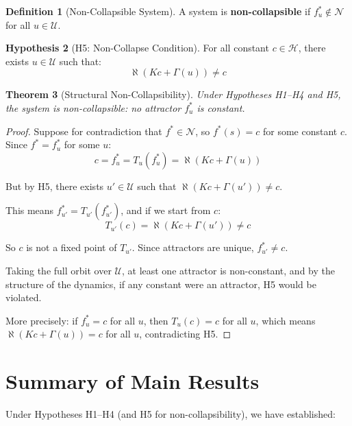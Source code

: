 \documentclass[11pt,a4paper]{article}
\theoremstyle{plain}
\newtheorem{theorem}{Theorem}[section]
\theoremstyle{definition}
\newtheorem{definition}[theorem]{Definition}
\newtheorem{hypothesis}[theorem]{Hypothesis}
\newcommand{\Hilb}{\mathcal{H}}
\newcommand{\U}{\mathcal{U}}
\begin{document}
\begin{definition}[Non-Collapsible System]
A system is \textbf{non-collapsible} if $f^*_u \notin \mathcal{N}$ for all $u \in \U$.
\end{definition}

\begin{hypothesis}[H5: Non-Collapse Condition]\label{hyp:H5}
For all constant $c \in \Hilb$, there exists $u \in \U$ such that:
\[
\aleph(Kc + \Gamma(u)) \neq c
\]
\end{hypothesis}

\begin{theorem}[Structural Non-Collapsibility]\label{thm:noncollapse}
Under Hypotheses H1--H4 and H5, the system is non-collapsible: no attractor $f^*_u$ is constant.
\end{theorem}

\begin{proof}
Suppose for contradiction that $f^* \in \mathcal{N}$, so $f^*(s) = c$ for some constant $c$. Since $f^* = f^*_u$ for some $u$:
\[
c = f^*_u = T_u(f^*_u) = \aleph(Kc + \Gamma(u))
\]

But by H5, there exists $u' \in \U$ such that $\aleph(Kc + \Gamma(u')) \neq c$.

This means $f^*_{u'} = T_{u'}(f^*_{u'})$, and if we start from $c$:
\[
T_{u'}(c) = \aleph(Kc + \Gamma(u')) \neq c
\]

So $c$ is not a fixed point of $T_{u'}$. Since attractors are unique, $f^*_{u'} \neq c$.

Taking the full orbit over $\U$, at least one attractor is non-constant, and by the structure of the dynamics, if any constant were an attractor, H5 would be violated.

More precisely: if $f^*_u = c$ for all $u$, then $T_u(c) = c$ for all $u$, which means $\aleph(Kc + \Gamma(u)) = c$ for all $u$, contradicting H5.
\end{proof}

\section{Summary of Main Results}

Under Hypotheses H1--H4 (and H5 for non-collapsibility), we have established:
\end{document}
